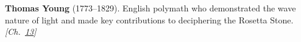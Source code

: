 \textbf{Thomas Young} (1773–1829). English polymath who demonstrated the wave nature of light and made key contributions to deciphering the Rosetta Stone. \emph{[Ch.~\hyperref[ch:poissonsspot]{13}]}

